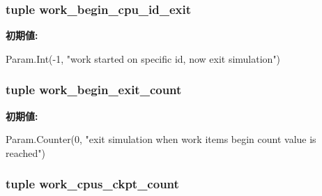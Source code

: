 \hypertarget{classSystem_1_1System_a2c4c04f4d52a246f8614d62e1e47ef6a}{
\subsubsection[{work\_\-begin\_\-cpu\_\-id\_\-exit}]{\setlength{\rightskip}{0pt plus 5cm}tuple {\bf work\_\-begin\_\-cpu\_\-id\_\-exit}}}
\label{classSystem_1_1System_a2c4c04f4d52a246f8614d62e1e47ef6a}
{\bfseries 初期値:}
\begin{DoxyCode}
Param.Int(-1,
        "work started on specific id, now exit simulation")
\end{DoxyCode}
\hypertarget{classSystem_1_1System_acd4a2ddc9e02b223901ffd00d09cf1bf}{
\subsubsection[{work\_\-begin\_\-exit\_\-count}]{\setlength{\rightskip}{0pt plus 5cm}tuple {\bf work\_\-begin\_\-exit\_\-count}}}
\label{classSystem_1_1System_acd4a2ddc9e02b223901ffd00d09cf1bf}
{\bfseries 初期値:}
\begin{DoxyCode}
Param.Counter(0,
        "exit simulation when work items begin count value is reached")
\end{DoxyCode}
\hypertarget{classSystem_1_1System_af88b3ed9c92ddf3321e4285196287311}{
\subsubsection[{work\_\-cpus\_\-ckpt\_\-count}]{\setlength{\rightskip}{0pt plus 5cm}tuple {\bf work\_\-cpus\_\-ckpt\_\-count}}}
\label{classSystem_1_1System_af88b3ed9c92ddf3321e4285196287311}
